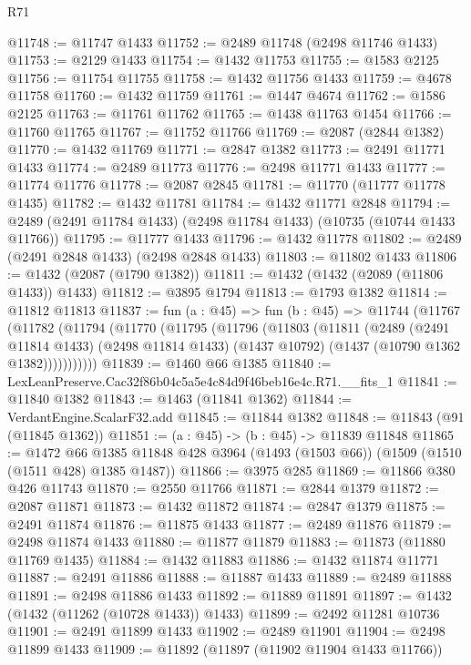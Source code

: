 \begin{lexlean}{R71}
\begin{coremodule}
@11748 := @11747 @1433
@11752 := @2489 @11748 (@2498 @11746 @1433)
@11753 := @2129 @1433
@11754 := @1432 @11753
@11755 := @1583 @2125
@11756 := @11754 @11755
@11758 := @1432 @11756 @1433
@11759 := @4678 @11758
@11760 := @1432 @11759
@11761 := @1447 @4674
@11762 := @1586 @2125
@11763 := @11761 @11762
@11765 := @1438 @11763 @1454
@11766 := @11760 @11765
@11767 := @11752 @11766
@11769 := @2087 (@2844 @1382)
@11770 := @1432 @11769
@11771 := @2847 @1382
@11773 := @2491 @11771 @1433
@11774 := @2489 @11773
@11776 := @2498 @11771 @1433
@11777 := @11774 @11776
@11778 := @2087 @2845
@11781 := @11770 (@11777 @11778 @1435)
@11782 := @1432 @11781
@11784 := @1432 @11771 @2848
@11794 := @2489 (@2491 @11784 @1433) (@2498 @11784 @1433) (@10735 (@10744 @1433 @11766))
@11795 := @11777 @1433
@11796 := @1432 @11778
@11802 := @2489 (@2491 @2848 @1433) (@2498 @2848 @1433)
@11803 := @11802 @1433
@11806 := @1432 (@2087 (@1790 @1382))
@11811 := @1432 (@1432 (@2089 (@11806 @1433)) @1433)
@11812 := @3895 @1794
@11813 := @1793 @1382
@11814 := @11812 @11813
@11837 := fun (a : @45) =>
  fun (b : @45) =>
  @11744
    (@11767
      (@11782
        (@11794
          (@11770
            (@11795
              (@11796
                (@11803
                  (@11811
                    (@2489
                      (@2491 @11814 @1433)
                      (@2498 @11814 @1433)
                      (@1437 @10792)
                      (@1437 (@10790 @1362 @1382)))))))))))
@11839 := @1460 @66 @1385
@11840 := LexLeanPreserve.Cac32f86b04c5a5e4c84d9f46beb16e4c.R71.__fits_1
@11841 := @11840 @1382
@11843 := @1463 (@11841 @1362)
@11844 := VerdantEngine.ScalarF32.add
@11845 := @11844 @1382
@11848 := @11843 (@91 (@11845 @1362))
@11851 := (a : @45) -> (b : @45) -> @11839 @11848
@11865 := @1472
    @66
    @1385
    @11848
    @428
    @3964
    (@1493 (@1503 @66))
    (@1509 (@1510 (@1511 @428) @1385 @1487))
@11866 := @3975 @285
@11869 := @11866 @380 @426 @11743
@11870 := @2550 @11766
@11871 := @2844 @1379
@11872 := @2087 @11871
@11873 := @1432 @11872
@11874 := @2847 @1379
@11875 := @2491 @11874
@11876 := @11875 @1433
@11877 := @2489 @11876
@11879 := @2498 @11874 @1433
@11880 := @11877 @11879
@11883 := @11873 (@11880 @11769 @1435)
@11884 := @1432 @11883
@11886 := @1432 @11874 @11771
@11887 := @2491 @11886
@11888 := @11887 @1433
@11889 := @2489 @11888
@11891 := @2498 @11886 @1433
@11892 := @11889 @11891
@11897 := @1432 (@1432 (@11262 (@10728 @1433)) @1433)
@11899 := @2492 @11281 @10736
@11901 := @2491 @11899 @1433
@11902 := @2489 @11901
@11904 := @2498 @11899 @1433
@11909 := @11892 (@11897 (@11902 @11904 @1433 @11766))

\end{coremodule}
\end{lexlean}
